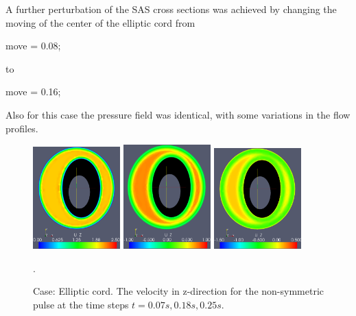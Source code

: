 A further perturbation of the SAS cross sections was achieved by changing the moving of the center of the elliptic cord from
\begin{code}
move = 0.08;
\end{code}
to
\begin{code}
move = 0.16;
\end{code}
Also for this case the pressure field was identical, with some variations in the flow profiles.



\begin{figure}\begin{center}
\includegraphics[width=0.3\textwidth]{chapters/hentschel/eps/pulse_f1_08_elliptic_sysmax_nmb7.eps}
\includegraphics[width=0.3\textwidth]{chapters/hentschel/eps/pulse_f1_08_elliptic_sysdia_nmb18.eps}
\includegraphics[width=0.3\textwidth]{chapters/hentschel/eps/pulse_f1_08_elliptic_diamin1_nmb25.eps}
\caption{Case: Elliptic cord. The velocity in z-direction for the non-symmetric pulse at the time steps $t=0.07s, 0.18s, 0.25s$.}
\label{fig:case3}. 
\end{center}\end{figure}



